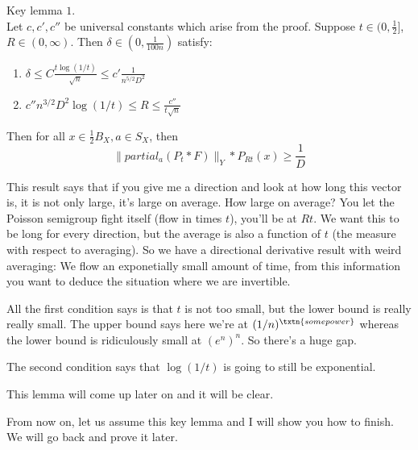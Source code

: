 \begin{lem} Key lemma $1$. \\
Let $c, c', c''$ be universal constants which arise from the proof. 
Suppose $t \in (0, \frac{1}{2}]$, $R \in (0, \infty)$. 
Then $\delta \in (0, \frac{1}{100n})$ satisfy: 
\begin{enumerate}

\item $ \delta \leq C \frac{t\log(1/t)}{\sqrt{n}} \leq c' \frac{1}{n^{5/2}D^2}$

\item $ c''n^{3/2}D^2\log(1/t) \leq R \leq \frac{c''}{t\sqrt{n}}$

\end{enumerate}

Then for all $x \in \frac{1}{2} B_X, a \in S_X$, then 
\[
\|partial_a(P_t*F)\|_Y * P_{Rt}(x) \ge \frac{1}{D}
\]

This result says that if you give me a direction and look at how long this vector is, it is not only large, it's large on average. How large on average? You let the Poisson semigroup fight itself (flow in times $t$), you'll be at $Rt$. We want this to be long for every direction, but the average is also a function of $t$ (the measure with respect to averaging). So we have a directional derivative result with weird averaging: We flow an exponetially small amount of time, from this information you want to deduce the situation where we are invertible. 

All the first condition says is that $t$ is not too small, but the lower bound is really really small. The upper bound says here we're at $(1/n)^{\txtn{some power}}$ whereas the lower bound is ridiculously small at $(e^n)^n$. So there's a huge gap.

The second condition says that $\log(1/t)$ is going to still be exponential. 
\end{lem}

This lemma will come up later on and it will be clear. 

From now on, let us assume this key lemma and I will show you how to finish. We will go back and prove it later. 

